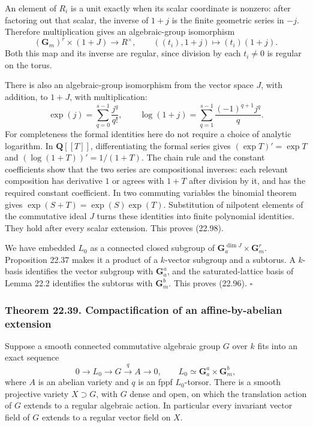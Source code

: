 \documentclass[
  11pt,
  a4paper,
]{article}
\begin{document}
An element of \(R_i\) is a unit exactly when its scalar coordinate is
nonzero: after factoring out that scalar, the inverse of \(1+j\) is the
finite geometric series in \(-j\). Therefore multiplication gives an
algebraic-group isomorphism \[
 (\mathbf G_m)^r\times(1+J)\longrightarrow R^\times,
 \qquad ((t_i),1+j)\longmapsto (t_i)(1+j).
\] Both this map and its inverse are regular, since division by each
\(t_i\ne0\) is regular on the torus.

There is also an algebraic-group isomorphism from the vector space
\(J\), with addition, to \(1+J\), with multiplication: \[
 \exp(j)=\sum_{q=0}^{s-1}\frac{j^q}{q!},\qquad
 \log(1+j)=\sum_{q=1}^{s-1}\frac{(-1)^{q+1}j^q}{q}.
 \tag{22.98}
\] For completeness the formal identities here do not require a choice
of analytic logarithm. In \(\mathbf Q[[T]]\), differentiating the formal
series gives \((\exp T)'=\exp T\) and \((\log(1+T))'=1/(1+T)\). The
chain rule and the constant coefficients show that the two series are
compositional inverses: each relevant composition has derivative \(1\)
or agrees with \(1+T\) after division by it, and has the required
constant coefficient. In two commuting variables the binomial theorem
gives \(\exp(S+T)=\exp(S)\exp(T)\). Substitution of nilpotent elements
of the commutative ideal \(J\) turns these identities into finite
polynomial identities. They hold after every scalar extension. This
proves (22.98).

We have embedded \(L_0\) as a connected closed subgroup of
\(\mathbf G_a^{\dim J}\times\mathbf G_m^r\). Proposition 22.37 makes it
a product of a \(k\)-vector subgroup and a subtorus. A \(k\)-basis
identifies the vector subgroup with \(\mathbf G_a^a\), and the
saturated-lattice basis of Lemma 22.2 identifies the subtorus with
\(\mathbf G_m^b\). This proves (22.96). \(\square\)

\subsubsection{Theorem 22.39. Compactification of an affine-by-abelian
extension}\label{theorem-22.39.-compactification-of-an-affine-by-abelian-extension}

Suppose a smooth connected commutative algebraic group \(G\) over \(k\)
fits into an exact sequence \[
 0\longrightarrow L_0\longrightarrow G\xrightarrow{q} A\longrightarrow0,
 \qquad L_0\simeq\mathbf G_a^a\times\mathbf G_m^b,
 \tag{22.99}
\] where \(A\) is an abelian variety and \(q\) is an fppf
\(L_0\)-torsor. There is a smooth projective variety \(X\supset G\),
with \(G\) dense and open, on which the translation action of \(G\)
extends to a regular algebraic action. In particular every invariant
vector field of \(G\) extends to a regular vector field on \(X\).
\end{document}
